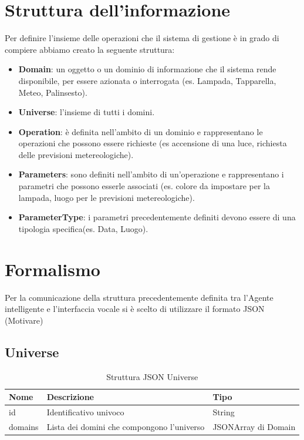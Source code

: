 \documentclass[twoside]{supsistudent}
\begin{document}
\section{Struttura dell'informazione}
Per definire l'insieme delle operazioni che il sistema di gestione è in grado di compiere abbiamo creato la seguente struttura:
\begin{itemize}
	\item \textbf{Domain}: un oggetto o un dominio di informazione che il sistema rende disponibile, per essere azionata o interrogata (es. Lampada, Tapparella, Meteo, Palinsesto).
	\item \textbf{Universe}: l'insieme di tutti i domini.
	\item \textbf{Operation}: è definita nell'ambito di un dominio e rappresentano le operazioni che possono essere richieste (es accensione di una luce, richiesta delle previsioni metereologiche).
	\item \textbf{Parameters}: sono definiti nell'ambito di un'operazione e rappresentano i parametri che possono esserle associati (es. colore da impostare per la lampada, luogo per le previsioni metereologiche).
	\item \textbf{ParameterType}: i parametri precedentemente definiti devono essere di una tipologia specifica(es. Data, Luogo).
\end{itemize}
\section{Formalismo}
Per la comunicazione della struttura precedentemente definita tra l'Agente intelligente e l'interfaccia vocale si è scelto di utilizzare il formato JSON (Motivare)

\subsection{Universe}
\begin{table}[H]
\centering
\caption{Struttura JSON Universe}
\label{Struttura JSON Universe}
\begin{tabular}{@{}|l|l|l|@{}}
\toprule
Nome    & Descrizione                                & Tipo                \\ \midrule
id      & Identificativo univoco                     & String             \\ \midrule
domains & Lista dei domini che compongono l'universo & JSONArray di Domain \\ \bottomrule
\end{tabular}
\end{table}
\end{document}
